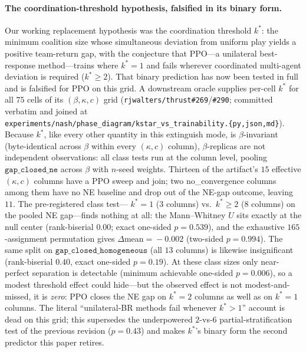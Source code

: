 \documentclass{anvil-paper}
\begin{document}
\paragraph{The coordination-threshold hypothesis, falsified in its
binary form.}
Our working replacement hypothesis was the coordination threshold
$k^{*}$: the minimum coalition size whose simultaneous deviation from
uniform play yields a positive team-return gap, with the conjecture
that PPO---a unilateral best-response method---trains where
$k^{*}{=}1$ and fails wherever coordinated multi-agent deviation is
required ($k^{*}{\geq}2$). That binary prediction has now been tested
in full and is falsified for PPO on this grid. A downstream oracle
supplies per-cell $k^{*}$ for all $75$ cells of its
$(\beta,\kappa,c)$ grid (\texttt{rjwalters/thrust\#269}/\texttt{\#290};
committed verbatim and joined at
\texttt{experiments/nash/phase\_diagram/kstar\_vs\_trainability.\{py,json,md\}}).
Because $k^{*}$, like every other quantity in this extinguish mode, is
$\beta$-invariant (byte-identical across $\beta$ within every
$(\kappa,c)$ column), $\beta$-replicas are not independent
observations: all class tests run at the column level, pooling
$\texttt{gap\_closed\_ne}$ across $\beta$ with $n$-seed weights.
Thirteen of the artifact's $15$ effective $(\kappa,c)$ columns have a
PPO sweep and join; two \textsf{no\_convergence} columns among them
have no NE baseline and drop out of the NE-gap outcome, leaving $11$.
The pre-registered class test---%
$k^{*}{=}1$ ($3$ columns) vs.\ $k^{*}{\geq}2$ ($8$ columns) on the
pooled NE gap---finds nothing at all: the Mann--Whitney $U$ sits
exactly at the null center (rank-biserial $0.00$; exact one-sided
$p{=}0.539$), and the exhaustive $165$-assignment permutation gives
$\Delta$mean${}={}-0.002$ (two-sided $p{=}0.994$). The same split on
$\texttt{gap\_closed\_homogeneous}$ (all $13$ columns) is likewise
insignificant (rank-biserial $0.40$, exact one-sided $p{=}0.19$). At
these class sizes only near-perfect separation is detectable (minimum
achievable one-sided $p{=}0.006$), so a modest threshold effect could
hide---but the observed effect is not modest-and-missed, it is
\emph{zero}: PPO closes the NE gap on $k^{*}{=}2$ columns as well as
on $k^{*}{=}1$ columns. The literal ``unilateral-BR methods fail
whenever $k^{*}{>}1$'' account is dead on this grid; this supersedes
the underpowered $2$-vs-$6$ partial-stratification test of the
previous revision ($p{=}0.43$) and makes $k^{*}$'s binary form the
second predictor this paper retires.
\end{document}
